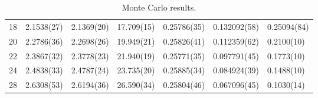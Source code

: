 \documentclass[12pt]{article}
\begin{document}
\begin{table}[t]
\begin{center}
{\begin{tabular}{|l|l|l|l|l|l|l|}
18 & 2.1538(27) & 2.1369(20) & 17.709(15) & 0.25786(35) & 0.132092(58) & 0.25094(84)\\ 
20 & 2.2786(36) & 2.2698(26) & 19.949(21) & 0.25826(41) & 0.112359(62) & 0.2100(10)\\ 
22 & 2.3867(32) & 2.3778(23) & 21.940(19) & 0.25771(35) & 0.097791(45) & 0.1773(10)\\ 
24 & 2.4838(33) & 2.4787(24) & 23.735(20) & 0.25885(34) & 0.084924(39) & 0.1488(10)\\ 
28 & 2.6308(53) & 2.6194(36) & 26.590(34) & 0.25804(46) & 0.067096(45) & 0.1030(14)\\ 
\hline 
\end{tabular}
}
\end{center}
\caption{Monte Carlo results.}
\label{table_tot_1}
\end{table}
\end{document}
